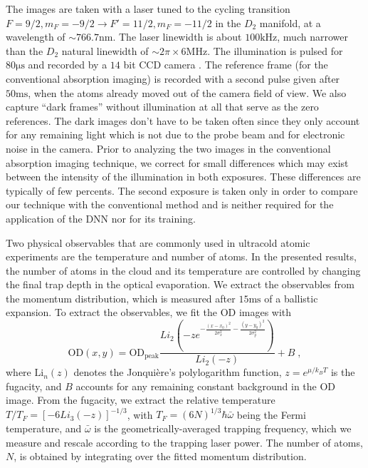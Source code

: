\documentclass[twocolumn,groupedaddress,longbibliography]{revtex4-1}
\begin{document}
The images are taken with a laser tuned to the cycling transition $F=9/2,m_F=-9/2\rightarrow F'=11/2,m_F=-11/2$ in the $D_2$ manifold, at a wavelength of $\sim766.7$nm. The laser linewidth is about $100\mathrm{kHz}$, much narrower than the $D_2$ natural linewidth of $\sim2\pi\times 6$MHz. The illumination is pulsed for  $80\mathrm{\mu s}$ and recorded by a $14$ bit CCD camera \cite{pixelflyModel}. The reference frame (for the conventional absorption imaging) is recorded with a second pulse given after $50\mathrm{ms}$, when the atoms already moved out of the camera field of view. We also capture ``dark frames'' without illumination at all that serve as the zero references. The dark images don't have to be taken often since they only account for any remaining light which is not due to the probe beam and for electronic noise in the camera. Prior to analyzing the two images in the conventional absorption imaging technique, we correct for small differences which may exist between the intensity of the illumination in both exposures. These differences are typically of few percents. The second exposure is taken only in order to compare our technique with the conventional method and is neither required for the application of the DNN nor for its training.

Two physical observables that are commonly used in ultracold atomic experiments are the temperature and number of atoms. In the presented results, the number of atoms in the cloud and its temperature are controlled by changing the final trap depth in the optical evaporation. We extract the observables from the momentum distribution, which is measured after $15\mathrm{ms}$ of a ballistic expansion. To extract the observables, we fit the OD images with \cite{MakingProbing}
\begin{equation}\label{eq:FD_dist_2d}
    \mathrm{OD}\left(x,y\right)=\mathrm{OD_{peak}}\frac{Li_2\left(-z e^{-\frac{\left(x-x_0\right)^2}{2\sigma_x^2}-\frac{\left(y-y_0\right)^2}{2\sigma_y^2}}\right)}{Li_2\left(-z\right)}+B\;, 
\end{equation}
where $\mathrm{Li}_{n}\left(z\right)$ denotes the Jonqui\`{e}re's polylogarithm function, $z=e^{\mu/k_BT}$ is the fugacity, and $B$ accounts for any remaining constant background in the OD image. From the fugacity, we extract the relative temperature $T/T_F=\left[-6Li_3\left(-z\right)\right]^{-1/3}$, with $T_F=\left(6N\right)^{1/3}\hbar\bar{\omega}$ being the Fermi temperature, and $\bar{\omega}$ is the geometrically-averaged trapping frequency, which we measure and rescale according to the trapping laser power. The number of atoms, $N$, is obtained by integrating over the fitted momentum distribution.
\end{document}
